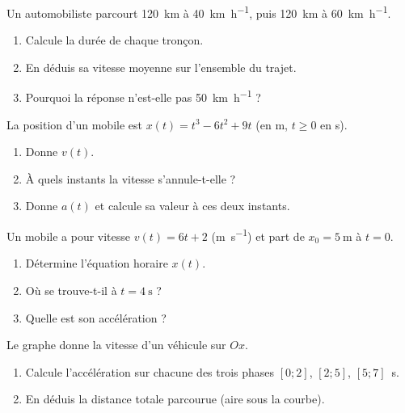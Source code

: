 \documentclass[11pt,a4paper]{article}
\begin{document}

\begin{exo}
Un automobiliste parcourt \qty{120}{\kilo\metre} à \qty{40}{\kilo\metre\per\hour}, puis
\qty{120}{\kilo\metre} à \qty{60}{\kilo\metre\per\hour}.
\begin{enumerate}[label=\alph*)]
  \item Calcule la durée de chaque tronçon.
  \item En déduis sa vitesse moyenne sur l'ensemble du trajet.
  \item Pourquoi la réponse n'est-elle pas \qty{50}{\kilo\metre\per\hour} ?
\end{enumerate}
\end{exo}

\begin{exo}
La position d'un mobile est $x(t)=t^3-6t^2+9t$ (en \si{\metre}, $t\ge0$ en \si{\second}).
\begin{enumerate}[label=\alph*)]
  \item Donne $v(t)$.
  \item À quels instants la vitesse s'annule-t-elle ?
  \item Donne $a(t)$ et calcule sa valeur à ces deux instants.
\end{enumerate}
\end{exo}

\begin{exo}
Un mobile a pour vitesse $v(t)=6t+2$ (\si{\metre\per\second}) et part de $x_0=\qty{5}{\metre}$ à $t=0$.
\begin{enumerate}[label=\alph*)]
  \item Détermine l'équation horaire $x(t)$.
  \item Où se trouve-t-il à $t=\qty{4}{\second}$ ?
  \item Quelle est son accélération ?
\end{enumerate}
\end{exo}

\begin{exo}
Le graphe donne la vitesse d'un véhicule sur $Ox$.
\begin{center}
\end{center}
\begin{enumerate}[label=\alph*)]
  \item Calcule l'accélération sur chacune des trois phases $[0;2]$, $[2;5]$, $[5;7]$~\si{\second}.
  \item En déduis la distance totale parcourue (aire sous la courbe).
\end{enumerate}
\end{exo}
\end{document}
